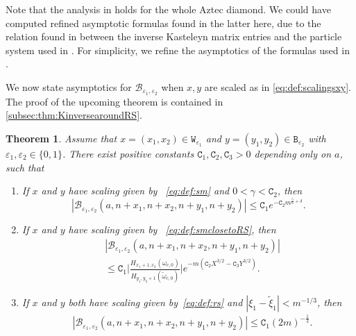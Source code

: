 \documentclass[11pt,twoside]{amsart}
\theoremstyle{plain}
\newtheorem{thm}{Theorem}[section]
\numberwithin{quest}{section}
\theoremstyle{remark}
\numberwithin{rem}{section}
\theoremstyle{definition}
\newcommand{\eps}{\varepsilon}
\begin{document}
	Note that the analysis in \cite{DK21} holds for the whole Aztec diamond. We could have computed refined asymptotic
	formulas found in the latter here, due to the relation found in \cite{CD23} between the inverse Kasteleyn matrix entries and the particle system used in \cite{DK21}. For simplicity, we refine the asymptotics of the formulas used in \cite{CJ16}.

    We now state asymptotics for $\mathcal{B}_{\eps_1,\eps_2}$ when $x, y$ are scaled as in \eqref{eq:def:scalingsxy}. The proof of the upcoming theorem is contained in \cref{subsec:thm:KinversearoundRS}.
	
	
	\begin{thm} \label{thm:prev:KinversearoundRS}
		Assume that $x=(x_1,x_2)\in \mathtt{W}_{\eps_1}$ and $y=(y_1,y_2) \in \mathtt{B}_{\eps_2}$ with $\eps_1,\eps_2 \in \{0,1\}$. There exist positive constants $\mathtt{C}_1,\mathtt{C}_2,\mathtt{C}_3>0$ depending only on $a$, such that
		\begin{enumerate}
			\item If $x$ and $y$ have scaling given by ~\eqref{eq:def:sm} and $0 < \gamma < \mathtt{C}_2$, then 
			\begin{equation} \label{thm:eq:KinversearoundRS:sm}
				|\mathcal{B}_{\eps_1,\eps_2} (a,n+x_1,n+x_2,n+y_1,n+y_2) | \leq \mathtt{C}_1e^{-\mathtt{C}_2 m^{\frac{5}{6}+\delta}}. 
			\end{equation}
			
			\item If $x$ and $y$ have scaling given by ~\eqref{eq:def:smclosetoRS}, then 
			\begin{equation}\label{thm:eq:KinversearoundRS:smclosetoRS}
				\begin{split}
					&|\mathcal{B}_{\eps_1,\eps_2} (a,n+x_1,n+x_2,n+y_1,n+y_2) |\\& \leq \mathtt{C}_1 \bigg|\frac{H_{x_1+1,x_2}(\omega_{c,0})}{H_{y_1,y_2+1}(\tilde{\omega}_{c,0})}\bigg| e^{-m(\mathtt{C}_2X^{3/2}-\mathtt{C}_3Y^{3/2})} .
				\end{split}
			\end{equation}
			\item If $x$ and $y$ both have scaling given by~\eqref{eq:def:rs} and $|\xi_1-\tilde{\xi}_1|<m^{-1/3}$, then 
			\begin{equation}
				\begin{split}\label{thm:eq:KinversearoundRS:RS}
					&|\mathcal{B}_{\eps_1,\eps_2} (a,n+x_1,n+x_2,n+y_1,n+y_2)| \leq \mathtt{C}_1 (2m)^{-\frac{1}{3}}.
				\end{split}
			\end{equation}
			

\end{enumerate}
\end{thm}
\end{document}

